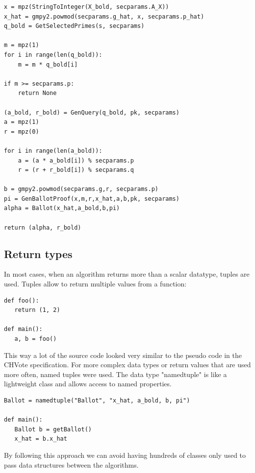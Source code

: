 \begin{multicols}{2}
\columnbreak
\begin{verbatim}
x = mpz(StringToInteger(X_bold, secparams.A_X))
x_hat = gmpy2.powmod(secparams.g_hat, x, secparams.p_hat)
q_bold = GetSelectedPrimes(s, secparams)

m = mpz(1)
for i in range(len(q_bold)):
    m = m * q_bold[i]

if m >= secparams.p:
    return None

(a_bold, r_bold) = GenQuery(q_bold, pk, secparams)
a = mpz(1)
r = mpz(0)

for i in range(len(a_bold)):
    a = (a * a_bold[i]) % secparams.p
    r = (r + r_bold[i]) % secparams.q

b = gmpy2.powmod(secparams.g,r, secparams.p)
pi = GenBallotProof(x,m,r,x_hat,a,b,pk, secparams)
alpha = Ballot(x_hat,a_bold,b,pi)

return (alpha, r_bold)
\end{verbatim}
\end{multicols}

\subsection{Return types}
In most cases, when an algorithm returns more than a scalar datatype, tuples are used. Tuples allow to return multiple values from a function:

\begin{verbatim}
def foo():
   return (1, 2)

def main():
   a, b = foo()
\end{verbatim}

This way a lot of the source code looked very similar to the pseudo code in the CHVote specification. For more complex data types or return values that are used more often, named tuples were used. The data type "namedtuple" is like a lightweight class and allows access to named properties.

\begin{verbatim}
Ballot = namedtuple("Ballot", "x_hat, a_bold, b, pi")

def main():
   Ballot b = getBallot()
   x_hat = b.x_hat
\end{verbatim}

By following this approach we can avoid having hundreds of classes only used to pass data structures between the algorithms.


